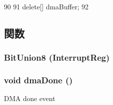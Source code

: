 \begin{DoxyCode}
90 {
91     delete[] dmaBuffer;
92 }
\end{DoxyCode}


\subsection{関数}
\hypertarget{classPl111_a6314622cb4d926c2f90ff68d0cbbf17c}{
\subsubsection[{BitUnion8}]{\setlength{\rightskip}{0pt plus 5cm}BitUnion8 (InterruptReg)}}
\label{classPl111_a6314622cb4d926c2f90ff68d0cbbf17c}
\hypertarget{classPl111_a06cfa1e5151d07acbefac240127d471b}{
\subsubsection[{dmaDone}]{\setlength{\rightskip}{0pt plus 5cm}void dmaDone ()}}
\label{classPl111_a06cfa1e5151d07acbefac240127d471b}
DMA done event 


